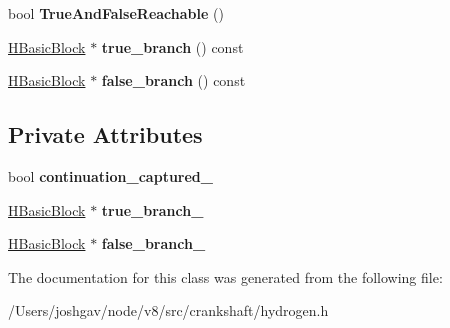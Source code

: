 \begin{DoxyCompactItemize}
\item 
bool {\bfseries True\+And\+False\+Reachable} ()\hypertarget{classv8_1_1internal_1_1_h_if_continuation_a298523580d85707c821730ca3e3f20fc}{}\label{classv8_1_1internal_1_1_h_if_continuation_a298523580d85707c821730ca3e3f20fc}

\item 
\hyperlink{classv8_1_1internal_1_1_h_basic_block}{H\+Basic\+Block} $\ast$ {\bfseries true\+\_\+branch} () const \hypertarget{classv8_1_1internal_1_1_h_if_continuation_ae86fb986d97a47183309a1018540c905}{}\label{classv8_1_1internal_1_1_h_if_continuation_ae86fb986d97a47183309a1018540c905}

\item 
\hyperlink{classv8_1_1internal_1_1_h_basic_block}{H\+Basic\+Block} $\ast$ {\bfseries false\+\_\+branch} () const \hypertarget{classv8_1_1internal_1_1_h_if_continuation_a2b1752fb3179bfa3dea12c702b6ec811}{}\label{classv8_1_1internal_1_1_h_if_continuation_a2b1752fb3179bfa3dea12c702b6ec811}

\end{DoxyCompactItemize}
\subsection*{Private Attributes}
\begin{DoxyCompactItemize}
\item 
bool {\bfseries continuation\+\_\+captured\+\_\+}\hypertarget{classv8_1_1internal_1_1_h_if_continuation_a635ae4c7c3d3d0d559238c4c027be1ef}{}\label{classv8_1_1internal_1_1_h_if_continuation_a635ae4c7c3d3d0d559238c4c027be1ef}

\item 
\hyperlink{classv8_1_1internal_1_1_h_basic_block}{H\+Basic\+Block} $\ast$ {\bfseries true\+\_\+branch\+\_\+}\hypertarget{classv8_1_1internal_1_1_h_if_continuation_a6f03e2db593257790c237cf399293288}{}\label{classv8_1_1internal_1_1_h_if_continuation_a6f03e2db593257790c237cf399293288}

\item 
\hyperlink{classv8_1_1internal_1_1_h_basic_block}{H\+Basic\+Block} $\ast$ {\bfseries false\+\_\+branch\+\_\+}\hypertarget{classv8_1_1internal_1_1_h_if_continuation_aaeaf6baff869ca0d7cabd0f7fdb534a4}{}\label{classv8_1_1internal_1_1_h_if_continuation_aaeaf6baff869ca0d7cabd0f7fdb534a4}

\end{DoxyCompactItemize}


The documentation for this class was generated from the following file\+:\begin{DoxyCompactItemize}
\item 
/\+Users/joshgav/node/v8/src/crankshaft/hydrogen.\+h\end{DoxyCompactItemize}
